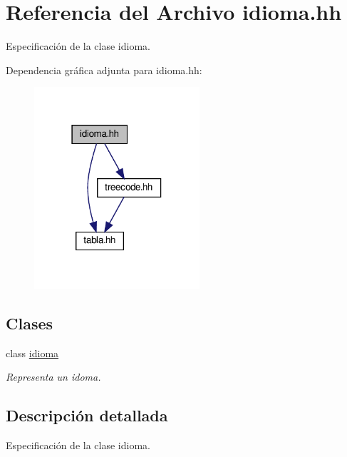 \hypertarget{idioma_8hh}{}\section{Referencia del Archivo idioma.\+hh}
\label{idioma_8hh}


Especificación de la clase idioma.  


Dependencia gráfica adjunta para idioma.\+hh\+:\nopagebreak
\begin{figure}[H]
\begin{center}
\leavevmode
\includegraphics[width=174pt]{idioma_8hh__incl}
\end{center}
\end{figure}
\subsection*{Clases}
\begin{DoxyCompactItemize}
\item 
class \hyperlink{classidioma}{idioma}
\begin{DoxyCompactList}\small\item\em Representa un idoma. \end{DoxyCompactList}\end{DoxyCompactItemize}


\subsection{Descripción detallada}
Especificación de la clase idioma. 

